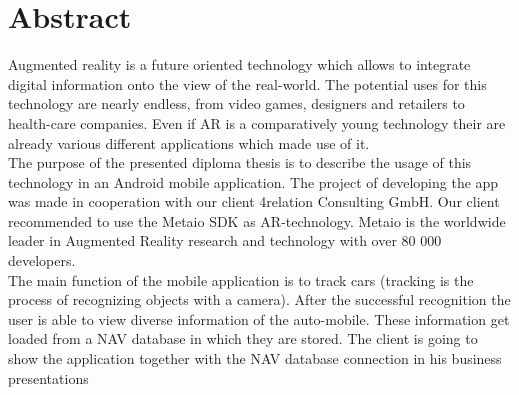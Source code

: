 \chapter*{Abstract}

Augmented reality is a future oriented technology which allows to integrate digital information onto the view of the real-world. The potential uses for this technology are nearly endless, from video games, designers and retailers to health-care companies. Even if AR is a comparatively young technology their are already various different applications which made use of it.          
\\

The purpose of the presented diploma thesis is to describe the usage of this technology in an Android mobile application. The project of developing the app was made in cooperation with our client 4relation Consulting GmbH. Our client recommended to use the Metaio SDK as AR-technology. Metaio is the worldwide leader in Augmented Reality research and technology with over 80 000 developers.
\\

The main function of the mobile application is to track cars (tracking is the process of recognizing objects with a camera). After the successful recognition the user is able to view diverse information of the auto-mobile. These information get loaded from a NAV database in which they are stored. The client is going to show the application together with the NAV database connection in his business presentations        